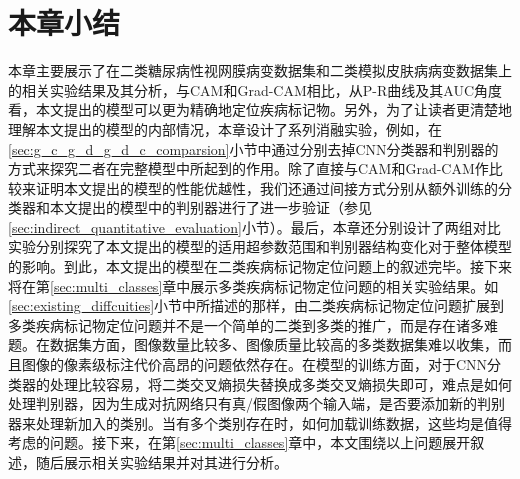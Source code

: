 \section{本章小结}
本章主要展示了在二类糖尿病性视网膜病变数据集和二类模拟皮肤病病变数据集上的相关实验结果及其分析，与CAM和Grad-CAM相比，从P-R曲线及其AUC角度看，本文提出的模型可以更为精确地定位疾病标记物。另外，为了让读者更清楚地理解本文提出的模型的内部情况，本章设计了系列消融实验，例如，在\ref{sec:g_c_g_d_g_d_c_comparsion}小节中通过分别去掉CNN分类器和判别器的方式来探究二者在完整模型中所起到的作用。除了直接与CAM和Grad-CAM作比较来证明本文提出的模型的性能优越性，我们还通过间接方式分别从额外训练的分类器和本文提出的模型中的判别器进行了进一步验证（参见\ref{sec:indirect_quantitative_evaluation}小节）。最后，本章还分别设计了两组对比实验分别探究了本文提出的模型的适用超参数范围和判别器结构变化对于整体模型的影响。到此，本文提出的模型在二类疾病标记物定位问题上的叙述完毕。接下来将在第\ref{sec:multi_classes}章中展示多类疾病标记物定位问题的相关实验结果。如\ref{sec:existing_diffcuities}小节中所描述的那样，由二类疾病标记物定位问题扩展到多类疾病标记物定位问题并不是一个简单的二类到多类的推广，而是存在诸多难题。在数据集方面，图像数量比较多、图像质量比较高的多类数据集难以收集，而且图像的像素级标注代价高昂的问题依然存在。在模型的训练方面，对于CNN分类器的处理比较容易，将二类交叉熵损失替换成多类交叉熵损失即可，难点是如何处理判别器，因为生成对抗网络只有真/假图像两个输入端，是否要添加新的判别器来处理新加入的类别。当有多个类别存在时，如何加载训练数据，这些均是值得考虑的问题。接下来，在第\ref{sec:multi_classes}章中，本文围绕以上问题展开叙述，随后展示相关实验结果并对其进行分析。


